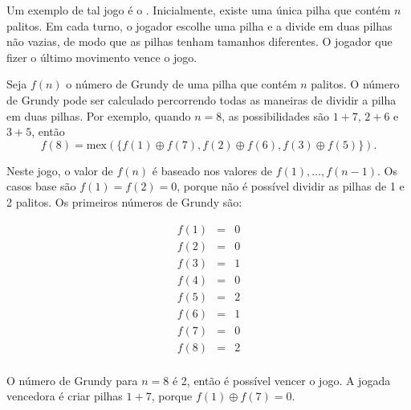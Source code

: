 Um exemplo de tal jogo é o . Inicialmente, existe uma única pilha que contém $n$ palitos. Em cada turno, o jogador escolhe uma pilha e a divide em duas pilhas não vazias, de modo que as pilhas tenham tamanhos diferentes. O jogador que fizer o último movimento vence o jogo.

Seja $f(n)$ o número de Grundy de uma pilha que contém $n$ palitos. O número de Grundy pode ser calculado percorrendo todas as maneiras de dividir a pilha em duas pilhas. Por exemplo, quando $n=8$, as possibilidades são $1+7$, $2+6$ e $3+5$, então
\[f(8)=\textrm{mex}(\{f(1) \oplus f(7), f(2) \oplus f(6), f(3) \oplus f(5)\}).\]

Neste jogo, o valor de $f(n)$ é baseado nos valores de $f(1),\ldots,f(n-1)$. Os casos base são $f(1)=f(2)=0$, porque não é possível dividir as pilhas de 1 e 2 palitos. Os primeiros números de Grundy são:

\[
\begin{array}{lcl}
f(1) & = & 0 \\
f(2) & = & 0 \\
f(3) & = & 1 \\
f(4) & = & 0 \\
f(5) & = & 2 \\
f(6) & = & 1 \\
f(7) & = & 0 \\
f(8) & = & 2 \\
\end{array}
\]

O número de Grundy para $n=8$ é 2, então é possível vencer o jogo. A jogada vencedora é criar pilhas $1+7$, porque $f(1) \oplus f(7) = 0$.
